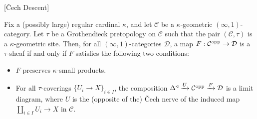 \documentclass[10pt]{article}
\newcommand{\C}{\mathcal C}
\newcommand{\cD}{\mathcal{D}}
\theoremstyle{witharg}
\theoremstyle{witharg}
\theoremstyle{witharg2}
\begin{document}
\begin{proposition}{}[\v{C}ech Descent]\label{Sheaf condition for topos-like categories}

    Fix a (possibly large) regular cardinal $\kappa$, and let $\C$ be a $\kappa$-geometric $(\infty,1)$-category. Let $\tau$ be a Grothendieck pretopology on $\C$ such that the pair $(\C,\tau)$ is a $\kappa$-geometric site. Then, for all $(\infty,1)$-categories $\cD$, a map $F:\C^{\textnormal{opp}}\rightarrow \cD$ is a $\tau$-sheaf if and only if $F$ satisfies the following two conditions:

    \begin{itemize}
    
        \item [$(1)$] $F$ preserves $\kappa$-small products. 

        \item [$(2)$] For all $\tau$-coverings $\{U_i\rightarrow X\}_{i\in I}$, the composition $\Delta^\triangleleft\xrightarrow{U}\C^{\textnormal{opp}}\xrightarrow{F}\cD$ is a limit diagram, where $U$ is the (opposite of the) \v{C}ech nerve of the induced map $\coprod_{i\in I}U_i\rightarrow X$ in $\C$. 
    
    \end{itemize}

\end{proposition}
\end{document}

